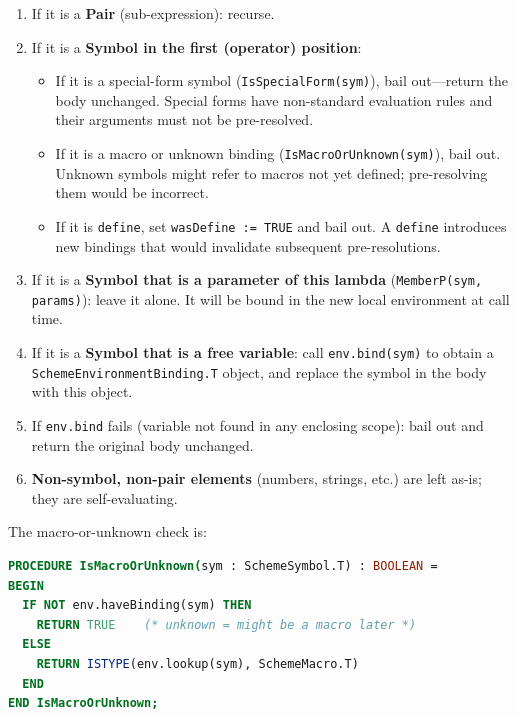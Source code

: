 \documentclass[12pt]{report}
\begin{document}
\begin{enumerate}
\item If it is a \textbf{Pair} (sub-expression): recurse.

\item If it is a \textbf{Symbol in the first (operator) position}:
  \begin{itemize}
  \item If it is a special-form symbol (\texttt{IsSpecialForm(sym)}),
    bail out---return the body unchanged.  Special forms have non-standard
    evaluation rules and their arguments must not be pre-resolved.
  \item If it is a macro or unknown binding (\texttt{IsMacroOrUnknown(sym)}),
    bail out.  Unknown symbols might refer to macros not yet defined;
    pre-resolving them would be incorrect.
  \item If it is \texttt{define}, set \texttt{wasDefine := TRUE} and
    bail out.  A \texttt{define} introduces new bindings that would
    invalidate subsequent pre-resolutions.
  \end{itemize}

\item If it is a \textbf{Symbol that is a parameter of this lambda}
  (\texttt{MemberP(sym, params)}): leave it alone.  It will be bound
  in the new local environment at call time.

\item If it is a \textbf{Symbol that is a free variable}: call
  \texttt{env.bind(sym)} to obtain a \texttt{SchemeEnvironmentBinding.T}
  object, and replace the symbol in the body with this object.

\item If \texttt{env.bind} fails (variable not found in any enclosing
  scope): bail out and return the original body unchanged.

\item \textbf{Non-symbol, non-pair elements} (numbers, strings, etc.)
  are left as-is; they are self-evaluating.
\end{enumerate}

The macro-or-unknown check is:

\begin{lstlisting}[language=Modula3]
PROCEDURE IsMacroOrUnknown(sym : SchemeSymbol.T) : BOOLEAN =
BEGIN
  IF NOT env.haveBinding(sym) THEN
    RETURN TRUE    (* unknown = might be a macro later *)
  ELSE
    RETURN ISTYPE(env.lookup(sym), SchemeMacro.T)
  END
END IsMacroOrUnknown;
\end{lstlisting}
\end{document}
